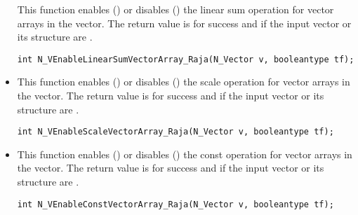 \begin{itemize}
This function enables () or disables () the linear sum
operation for vector arrays in the {\raja} vector. The return value is  for
success and  if the input vector or its  structure are .

\verb|int N_VEnableLinearSumVectorArray_Raja(N_Vector v, booleantype tf);|


\item {}

This function enables () or disables () the scale
operation for vector arrays in the {\raja} vector. The return value is  for
success and  if the input vector or its  structure are .

\verb|int N_VEnableScaleVectorArray_Raja(N_Vector v, booleantype tf);|


\item {}

This function enables () or disables () the const
operation for vector arrays in the {\raja} vector. The return value is  for
success and  if the input vector or its  structure are .

\verb|int N_VEnableConstVectorArray_Raja(N_Vector v, booleantype tf);|









\end{itemize}
